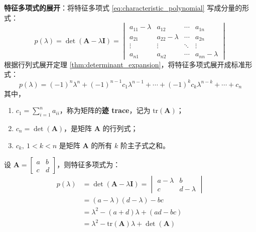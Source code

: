 \textbf{特征多项式的展开}：将特征多项式 \ref{eq:characteristic_polynomial} 写成分量的形式：
\[
    p(\lambda) = \det(\mathbf{A} - \lambda \mathbf{I}) = \begin{vmatrix}
        a_{11}-\lambda & a_{12} & \cdots & a_{1n} \\
        a_{21} & a_{22}-\lambda & \cdots & a_{2n} \\
        \vdots & \vdots & \ddots & \vdots \\
        a_{n1} & a_{n2} & \cdots & a_{nn}-\lambda
    \end{vmatrix}
\]
根据行列式展开定理 \ref{thm:determinant_expansion}，将特征多项式展开成标准形式：
\begin{equation}
    p(\lambda) = (-1)^n \lambda^n + (-1)^{n-1} c_1 \lambda^{n-1} + \cdots + (-1)^k c_k \lambda^{n-k} + \cdots +  c_n
    \label{eq:characteristic_polynomial_expansion}
\end{equation}
其中，
\begin{enumerate}
    \item $c_1 = \sum^n_{i=1} a_{ii} $，称为矩阵的\textbf{迹 trace}，记为 $\mathrm{tr}(\mathbf{A})$；
    \item $c_n = \det(\mathbf{A})$，是矩阵 $\mathbf{A}$ 的行列式；
    \item $c_k,\ 1< k < n$ 是矩阵 $\mathbf{A}$ 的所有 $k$ 阶主子式之和。
\end{enumerate}
\vspace{1em}

\begin{example}[二阶方阵的特征多项式展开]
    设 $\mathbf{A} = \begin{bmatrix}
        a & b \\
        c & d
    \end{bmatrix}$，则特征多项式为：
    \begin{align}
        p(\lambda) &= \det(\mathbf{A} - \lambda \mathbf{I}) = \begin{vmatrix}
            a - \lambda & b \\
            c & d - \lambda
        \end{vmatrix} \\
        &= (a - \lambda)(d - \lambda) - bc \\
        &= \lambda^2 - (a + d)\lambda + (ad - bc)\\
        &= \lambda^2 - \mathrm{tr}(\mathbf{A})\lambda + \det(\mathbf{A})
        \label{eq:characteristic_polynomial_2x2}
    \end{align}
\end{example}

